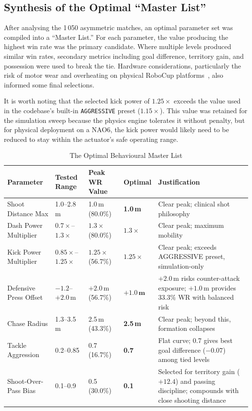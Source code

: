 \documentclass[12pt, a4paper]{report}
\begin{document}
\subsection{Synthesis of the Optimal ``Master List''}

After analysing the 1\,050 asymmetric matches, an optimal parameter set was
compiled into a ``Master List.''
For each parameter, the value producing the highest win rate was the primary
candidate.
Where multiple levels produced similar win rates, secondary metrics
including goal difference, territory gain, and possession were used to
break the tie.
Hardware considerations, particularly the risk of motor wear and overheating
on physical RoboCup platforms~\cite{robocup2024}, also informed some final
selections.

It is worth noting that the selected kick power of $1.25\times$ exceeds the
value used in the codebase's built-in \texttt{AGGRESSIVE} preset
($1.15\times$). This value was retained for the simulation sweep because
the physics engine tolerates it without penalty, but for physical deployment
on a NAO6, the kick power would likely need to be reduced to stay within
the actuator's safe operating range.

\begin{table}[h]
  \centering
  \caption{The Optimal Behavioural Master List}
  \label{tab:master-list}
  \small
  \begin{tabular}{p{2.8cm} p{2.0cm} p{2.5cm} p{1.8cm} p{4.5cm}}
    \toprule
    \textbf{Parameter} & \textbf{Tested Range} & \textbf{Peak WR Value}
      & \textbf{Optimal} & \textbf{Justification} \\
    \midrule
    Shoot Distance Max & 1.0--2.8\,m & 1.0\,m (80.0\%) & \textbf{1.0\,m}
      & Clear peak; clinical shot philosophy \\
    Dash Power Multiplier & $0.7\times$--$1.3\times$ & $1.3\times$ (80.0\%)
      & $\mathbf{1.3\times}$
      & Clear peak; maximum mobility \\
    Kick Power Multiplier & $0.85\times$--$1.25\times$
      & $1.25\times$ (56.7\%)
      & $\mathbf{1.25\times}$
      & Clear peak; exceeds AGGRESSIVE preset, simulation-only \\
    Defensive Press Offset & $-1.2$--$+2.0$\,m & $+2.0$\,m (56.7\%)
      & $\mathbf{+1.0\,m}$
      & $+2.0$\,m risks counter-attack exposure; $+1.0$\,m provides
        33.3\% WR with balanced risk \\
    Chase Radius & 1.3--3.5\,m & 2.5\,m (43.3\%) & \textbf{2.5\,m}
      & Clear peak; beyond this, formation collapses \\
    Tackle Aggression & 0.2--0.85 & 0.7 (16.7\%) & \textbf{0.7}
      & Flat curve; 0.7 gives best goal difference ($-0.07$) among tied
        levels \\
    Shoot-Over-Pass Bias & 0.1--0.9 & 0.5 (30.0\%) & \textbf{0.1}
      & Selected for territory gain ($+12.4$) and passing discipline;
        compounds with close shooting distance \\
    \bottomrule
  \end{tabular}
\end{table}
\end{document}
